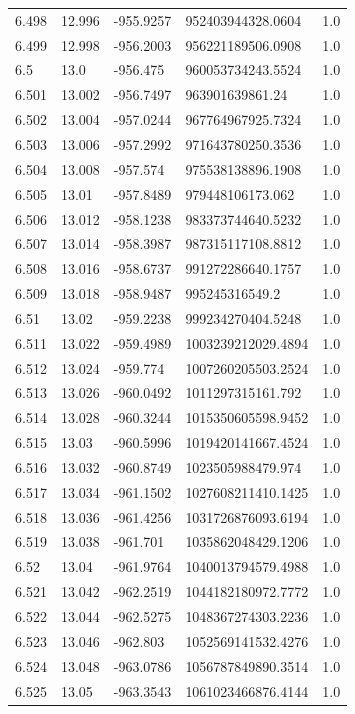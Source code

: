\begin{tabular}{lllll}
6.498 & 12.996 & -955.9257 & 952403944328.0604 & 1.0 \\
6.499 & 12.998 & -956.2003 & 956221189506.0908 & 1.0 \\
6.5 & 13.0 & -956.475 & 960053734243.5524 & 1.0 \\
6.501 & 13.002 & -956.7497 & 963901639861.24 & 1.0 \\
6.502 & 13.004 & -957.0244 & 967764967925.7324 & 1.0 \\
6.503 & 13.006 & -957.2992 & 971643780250.3536 & 1.0 \\
6.504 & 13.008 & -957.574 & 975538138896.1908 & 1.0 \\
6.505 & 13.01 & -957.8489 & 979448106173.062 & 1.0 \\
6.506 & 13.012 & -958.1238 & 983373744640.5232 & 1.0 \\
6.507 & 13.014 & -958.3987 & 987315117108.8812 & 1.0 \\
6.508 & 13.016 & -958.6737 & 991272286640.1757 & 1.0 \\
6.509 & 13.018 & -958.9487 & 995245316549.2 & 1.0 \\
6.51 & 13.02 & -959.2238 & 999234270404.5248 & 1.0 \\
6.511 & 13.022 & -959.4989 & 1003239212029.4894 & 1.0 \\
6.512 & 13.024 & -959.774 & 1007260205503.2524 & 1.0 \\
6.513 & 13.026 & -960.0492 & 1011297315161.792 & 1.0 \\
6.514 & 13.028 & -960.3244 & 1015350605598.9452 & 1.0 \\
6.515 & 13.03 & -960.5996 & 1019420141667.4524 & 1.0 \\
6.516 & 13.032 & -960.8749 & 1023505988479.974 & 1.0 \\
6.517 & 13.034 & -961.1502 & 1027608211410.1425 & 1.0 \\
6.518 & 13.036 & -961.4256 & 1031726876093.6194 & 1.0 \\
6.519 & 13.038 & -961.701 & 1035862048429.1206 & 1.0 \\
6.52 & 13.04 & -961.9764 & 1040013794579.4988 & 1.0 \\
6.521 & 13.042 & -962.2519 & 1044182180972.7772 & 1.0 \\
6.522 & 13.044 & -962.5275 & 1048367274303.2236 & 1.0 \\
6.523 & 13.046 & -962.803 & 1052569141532.4276 & 1.0 \\
6.524 & 13.048 & -963.0786 & 1056787849890.3514 & 1.0 \\
6.525 & 13.05 & -963.3543 & 1061023466876.4144 & 1.0 \\

\end{tabular}

